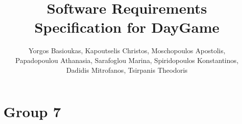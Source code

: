 \documentclass[12pt]{report}
\title{Software Requirements Specification for DayGame}
\author{Yorgos Basioukas, Kapoutselis Christos, Moschopoulos Apostolis, \\
Papadopoulou Athanasia, Sarafoglou Marina, Spiridopoulos Konstantinos, \\
Dadidis Mitrofanos, Tsirpanis Theodoris}
\date{}
\renewcommand{\_}{\kern-1.5pt\textunderscore\kern-1.5pt}
\begin{document}
\maketitle
\setlength{\parskip}{2.04pt}
\par

\chapter{Group 7}\par


\vspace{\baselineskip}

\vspace{\baselineskip}

\vspace{\baselineskip}

\vspace{\baselineskip}

\vspace{\baselineskip}

\vspace{\baselineskip}

\vspace{\baselineskip}

\vspace{\baselineskip}

\vspace{\baselineskip}

\vspace{\baselineskip}

\vspace{\baselineskip}


\end{document}
